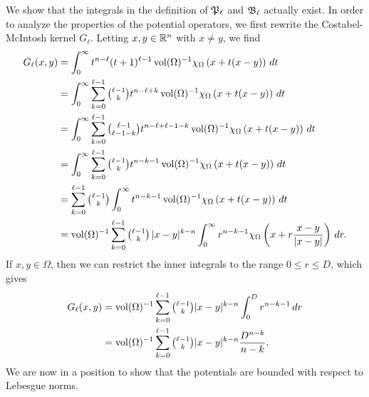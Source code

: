 \documentclass[10pt,letterpaper]{article}
\begin{document}
We show that the integrals in the definition of ${\mathfrak P}_{\ell}$ and ${\mathfrak B}_{\ell}$ actually exist. 
In order to analyze the properties of the potential operators,
we first rewrite the Costabel-McIntosh kernel $G_{\ell}$.
Letting $x,y \in {\mathbb R}^n$ with $x \neq y$, we find 
\begin{align*}
    G_{\ell}(x,y) 
    &= 
    \int_{0}^{\infty} t^{n-\ell} (t+1)^{\ell-1} \operatorname{vol}(\Omega)^{-1} \chi_{\Omega} \left( x+t(x-y) \right)\,dt
    \\
    &= 
    \int_{0}^{\infty} \sum_{k=0}^{\ell-1} \tbinom{\ell-1}{k} t^{n-\ell+k} \operatorname{vol}(\Omega)^{-1} \chi_{\Omega} \left( x+t(x-y) \right)\,dt
    \\
    &= 
    \int_{0}^{\infty} \sum_{k=0}^{\ell-1} \tbinom{\ell-1}{\ell-1-k} t^{n-\ell+\ell-1-k} \operatorname{vol}(\Omega)^{-1} \chi_{\Omega} \left( x+t(x-y) \right)\,dt
    \\
    &= 
    \int_{0}^{\infty} \sum_{k=0}^{\ell-1} \tbinom{\ell-1}{k} t^{n-k-1} \operatorname{vol}(\Omega)^{-1} \chi_{\Omega} \left( x+t(x-y) \right)\,dt
    \\
    &= 
    \sum_{k=0}^{\ell-1} \tbinom{\ell-1}{k} \int_{0}^{\infty} t^{n-k-1} \operatorname{vol}(\Omega)^{-1} \chi_{\Omega}\left( x+t(x-y) \right)\,dt 
    \\
    &= 
    \operatorname{vol}(\Omega)^{-1} \sum_{k=0}^{\ell-1} \tbinom{\ell-1}{k} \, |x-y|^{k-n} \int_{0}^{\infty} r^{n-k-1} \chi_{\Omega}\left(x+r\frac{x-y}{|x-y|}\right)\,dr
    .
\end{align*}
If $x, y \in \Omega$, then we can restrict the inner integrals to the range $0 \leq r \leq D$, which gives 
\begin{align*}
    G_{\ell}(x,y) 
    &= 
    \operatorname{vol}(\Omega)^{-1} \sum_{k=0}^{\ell-1}\tbinom{\ell-1}{k} |x-y|^{k-n} \int_{0}^{D} r^{n-k-1} \,dr 
    \\
    &= 
    \operatorname{vol}(\Omega)^{-1} \sum_{k=0}^{\ell-1}\tbinom{\ell-1}{k} |x-y|^{k-n} \frac{ D^{n-k} }{n-k}.
\end{align*}
We are now in a position to show that the potentials are bounded with respect to Lebesgue norms. 
\end{document}
